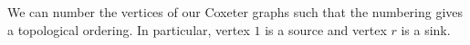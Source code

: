 We can number the vertices of our Coxeter graphs such that the numbering
gives a topological ordering. In particular, vertex $1$ is a source and
vertex $r$ is a sink.
